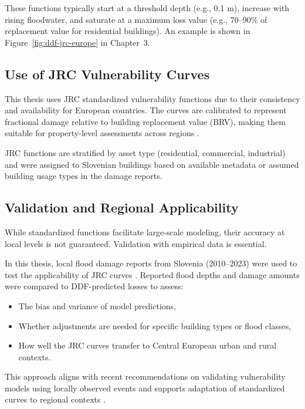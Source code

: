 These functions typically start at a threshold depth (e.g., 0.1 m), increase with rising floodwater, and saturate at a maximum loss value (e.g., 70--90\% of replacement value for residential buildings). An example is shown in Figure~\ref{fig:ddf-jrc-europe} in Chapter~3.

\subsection{Use of JRC Vulnerability Curves}

This thesis uses JRC standardized vulnerability functions due to their consistency and availability for European countries. The curves are calibrated to represent fractional damage relative to building replacement value (BRV), making them suitable for property-level assessments across regions \cite{huizinga_global_2017}.

JRC functions are stratified by asset type (residential, commercial, industrial) and were assigned to Slovenian buildings based on available metadata or assumed building usage types in the damage reports.

\subsection{Validation and Regional Applicability}

While standardized functions facilitate large-scale modeling, their accuracy at local levels is not guaranteed. Validation with empirical data is essential.

In this thesis, local flood damage reports from Slovenia (2010--2023) were used to test the applicability of JRC curves \cite{urszr_damage_data}. Reported flood depths and damage amounts were compared to DDF-predicted losses to assess:

\begin{itemize}
    \item The bias and variance of model predictions,
    \item Whether adjustments are needed for specific building types or flood classes,
    \item How well the JRC curves transfer to Central European urban and rural contexts.
\end{itemize}

This approach aligns with recent recommendations on validating vulnerability models using locally observed events and supports adaptation of standardized curves to regional contexts \cite{gentile_scoring_2022}.

